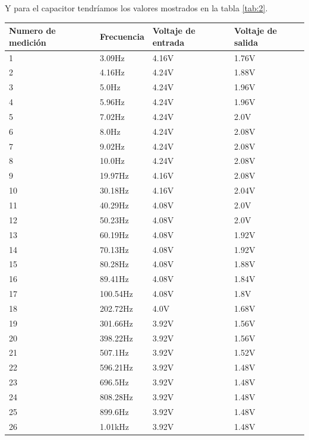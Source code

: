 \documentclass[letterpaper,spanish,12pt]{report}
\begin{document}
Y para el capacitor tendr\'iamos los valores mostrados en la tabla \ref{tab:2}.

\begin{table}[h]
	\centering
		\begin{tabular}{|l|l|l|l|}
			\hline
			Numero de medici\'on & Frecuencia & Voltaje de entrada & 			Voltaje de salida\\
			\hline \hline
			1 & 3.09Hz & 4.16V & 1.76V \\
			\hline
			2 & 4.16Hz & 4.24V & 1.88V \\
			\hline
			3 & 5.0Hz & 4.24V & 1.96V \\
			\hline
			4 & 5.96Hz & 4.24V & 1.96V \\
			\hline
			5 & 7.02Hz & 4.24V & 2.0V \\
			\hline
			6 & 8.0Hz & 4.24V & 2.08V \\
			\hline
			7 & 9.02Hz & 4.24V & 2.08V \\
			\hline
			8 & 10.0Hz & 4.24V & 2.08V \\
			\hline
			9 & 19.97Hz & 4.16V & 2.08V \\
			\hline
			10 & 30.18Hz & 4.16V & 2.04V \\
			\hline
			11 & 40.29Hz & 4.08V & 2.0V \\
			\hline
			12 & 50.23Hz & 4.08V & 2.0V \\
			\hline
			13 & 60.19Hz & 4.08V & 1.92V \\
			\hline
			14 & 70.13Hz & 4.08V & 1.92V \\
			\hline
			15 & 80.28Hz & 4.08V & 1.88V \\
			\hline
			16 & 89.41Hz & 4.08V & 1.84V \\
			\hline
			17 & 100.54Hz & 4.08V & 1.8V \\
			\hline
			18 & 202.72Hz & 4.0V & 1.68V \\
			\hline
			19 & 301.66Hz & 3.92V & 1.56V \\
			\hline
			20 & 398.22Hz & 3.92V & 1.56V \\
			\hline
			21 & 507.1Hz & 3.92V & 1.52V \\
			\hline
			22 & 596.21Hz & 3.92V & 1.48V \\
			\hline
			23 & 696.5Hz & 3.92V & 1.48V \\
			\hline
			24 & 808.28Hz & 3.92V & 1.48V \\
			\hline
			25 & 899.6Hz & 3.92V & 1.48V \\
			\hline
			26 & 1.01kHz & 3.92V & 1.48V \\
			\hline

\end{tabular}
\end{table}
\end{document}
